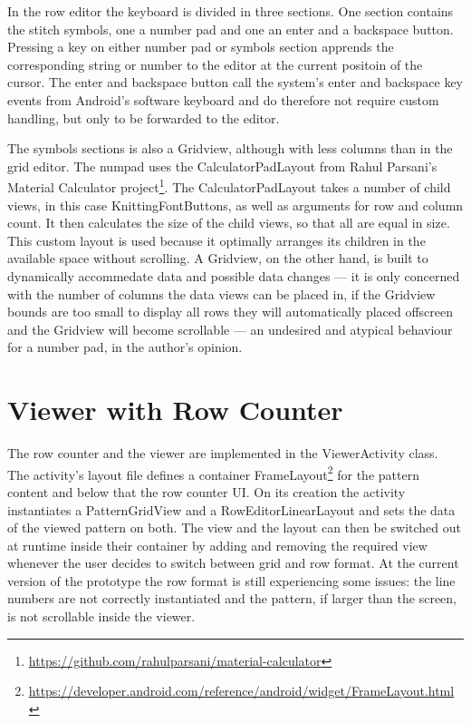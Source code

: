 In the row editor the keyboard is divided in three sections. One section contains the stitch symbols, one a number pad and one an enter and a backspace button. Pressing a key on either number pad or symbols section apprends the corresponding string or number to the editor at the current positoin of the cursor. The enter and backspace button call the system’s enter and backspace key events from Android’s software keyboard and do therefore not require custom handling, but only to be forwarded to the editor.

The symbols sections is also a Gridview, although with less columns than in the grid editor. The numpad uses the CalculatorPadLayout from Rahul Parsani's Material Calculator project\footnote{\url{https://github.com/rahulparsani/material-calculator}}. The CalculatorPadLayout takes a number of child views, in this case KnittingFontButtons, as well as arguments for row and column count. It then calculates the size of the child views, so that all are equal in size. This custom layout is used because it optimally arranges its children in the available space without scrolling. A Gridview, on the other hand, is built to dynamically accommedate data and possible data changes --- it is only concerned with the number of columns the data views can be placed in, if the Gridview bounds are too small to display all rows they will automatically placed offscreen and the Gridview will become scrollable --- an undesired and atypical behaviour for a number pad, in the author's opinion.

\section{Viewer with Row Counter}
The row counter and the viewer are implemented in the ViewerActivity class. The activity's layout file defines a container FrameLayout\footnote{\url{https://developer.android.com/reference/android/widget/FrameLayout.html}} for the pattern content and below that the row counter \gls{UI}. On its creation the activity instantiates a PatternGridView and a RowEditorLinearLayout and sets the data of the viewed pattern on both. The view and the layout can then be switched out at runtime inside their container by adding and removing the required view whenever the user decides to switch between grid and row format.
At the current version of the prototype the row format is still experiencing some issues: the line numbers are not correctly instantiated and the pattern, if larger than the screen, is not scrollable inside the viewer.

